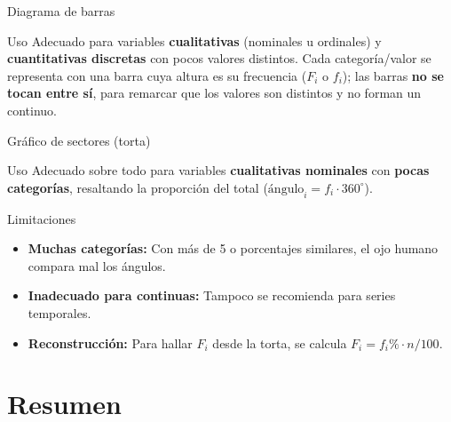 \documentclass[aspectratio=169,11pt]{beamer}
\begin{document}
\begin{frame}{Diagrama de barras}
\begin{block}{Uso}
Adecuado para variables \textbf{cualitativas} (nominales u ordinales) y \textbf{cuantitativas discretas} con pocos valores distintos. Cada categoría/valor se representa con una barra cuya altura es su frecuencia ($F_i$ o $f_i$); las barras \textbf{no se tocan entre sí}, para remarcar que los valores son distintos y no forman un continuo.
\end{block}
\centering
{}
\end{frame}

\begin{frame}{Gráfico de sectores (torta)}
\begin{block}{Uso}
Adecuado sobre todo para variables \textbf{cualitativas nominales} con \textbf{pocas categorías}, resaltando la proporción del total ($\text{ángulo}_i = f_i \cdot 360^\circ$).
\end{block}

\begin{alertblock}{Limitaciones}
\small
\begin{itemize}
\item \textbf{Muchas categorías:} Con más de 5 o porcentajes similares, el ojo humano compara mal los ángulos.
\item \textbf{Inadecuado para continuas:} Tampoco se recomienda para series temporales.
\item \textbf{Reconstrucción:} Para hallar $F_i$ desde la torta, se calcula $F_i = f_i\% \cdot n / 100$.
\end{itemize}
\end{alertblock}
\end{frame}

\section{Resumen}
\end{document}
